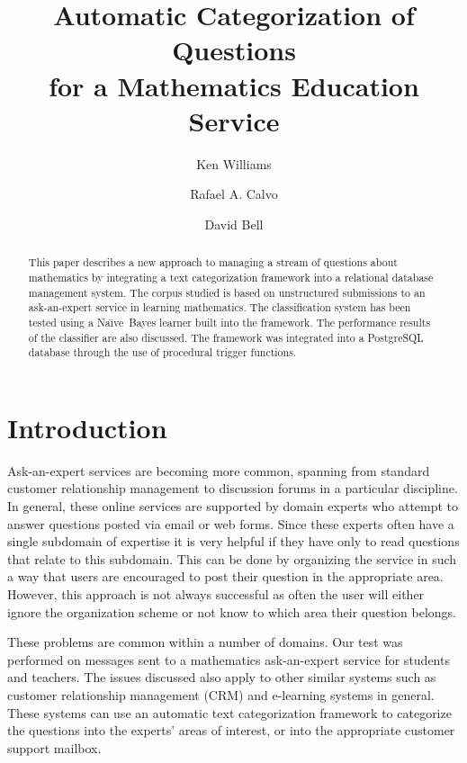 \documentclass{ios}
\newcommand{\naive}{Na\"\i ve}
\begin{document}
\title{Automatic Categorization of Questions \\ for a Mathematics Education Service}

\author{Ken Williams \and Rafael A. Calvo \and David Bell}


\address{
Web Engineering Group\\
The University of Sydney\\
Bldg J03, Sydney NSW 2006\\[1ex]
{\em {\{kenw,rafa\}}@ee.usyd.edu.au},
{\em dave@student.usyd.edu.au}
}

\maketitle

\begin{abstract}
This paper describes a new approach to managing a stream of questions about 
mathematics by integrating a text categorization framework into a relational database 
management system. The corpus studied is based on unstructured submissions to an 
ask-an-expert service in learning mathematics. The classification system has 
been tested using a \naive\ Bayes learner built into the framework. The 
performance results of the classifier are also discussed. The framework was integrated 
into a PostgreSQL database through the use of procedural trigger functions.
\end{abstract}


\section{Introduction}

Ask-an-expert services are becoming more common, spanning from standard 
customer relationship management to discussion forums in a particular discipline. In 
general, these online services are supported by domain experts who attempt to answer 
questions posted via email or web forms. Since these experts often have a single subdomain of expertise it is 
very helpful if they have only to read questions that relate to this subdomain. This can be 
done by organizing the service in such a way that users are encouraged to post their 
question in the appropriate area. However, this approach is not always successful as 
often the user will either ignore the organization scheme or not know to which area their 
question belongs. 

These problems are common within a number of domains. Our test was performed on 
messages sent to a mathematics ask-an-expert
service for students and teachers.\cite{drmath} The issues 
discussed also apply to other similar systems such as customer relationship 
management (CRM) and e-learning systems in general. These systems can use an 
automatic text categorization framework to categorize the questions into the experts' 
areas of interest, or into the appropriate customer support mailbox. 
\end{document}
